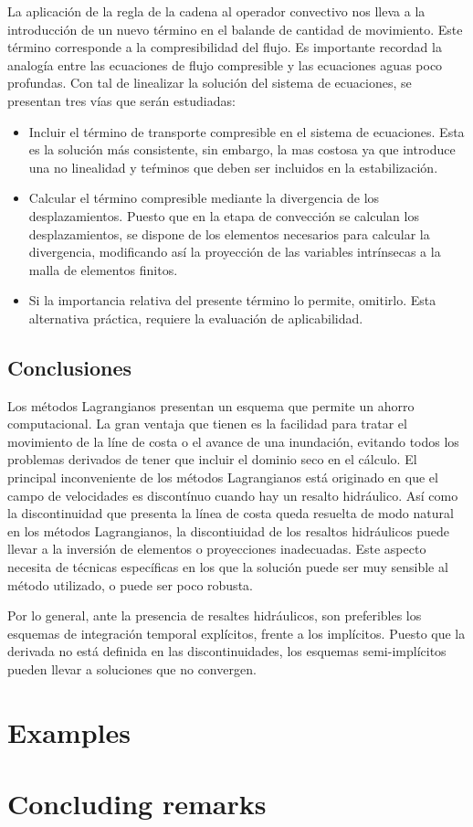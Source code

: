La aplicación de la regla de la cadena al operador convectivo nos lleva a la introducción de un nuevo término en el balande de cantidad de movimiento. Este término corresponde a la compresibilidad del flujo. Es importante recordad la analogía entre las ecuaciones de flujo compresible y las ecuaciones aguas poco profundas. Con tal de linealizar la solución del sistema de ecuaciones, se presentan tres vías que serán estudiadas:
\begin{itemize}
    \item Incluir el término de transporte compresible en el sistema de ecuaciones. Esta es la solución más consistente, sin embargo, la mas costosa ya que introduce una no linealidad y teŕminos que deben ser incluidos en la estabilización.
    \item Calcular el término compresible mediante la divergencia de los desplazamientos. Puesto que en la etapa de convección se calculan los desplazamientos, se dispone de los elementos necesarios para calcular la divergencia, modificando así la proyección de las variables intrínsecas a la malla de elementos finitos.
    \item Si la importancia relativa del presente término lo permite, omitirlo. Esta alternativa práctica, requiere la evaluación de aplicabilidad.
\end{itemize}


\subsection{Conclusiones}

Los métodos Lagrangianos presentan un esquema que permite un ahorro computacional. La gran ventaja que tienen es la facilidad para tratar el movimiento de la líne de costa o el avance de una inundación, evitando todos los problemas derivados de tener que incluir el dominio seco en el cálculo. El principal inconveniente de los métodos Lagrangianos está originado en que el campo de velocidades es discontínuo cuando hay un resalto hidráulico. Así como la discontinuidad que presenta la línea de costa queda resuelta de modo natural en los métodos Lagrangianos, la discontiuidad de los resaltos hidráulicos puede llevar a la inversión de elementos o proyecciones inadecuadas. Este aspecto necesita de técnicas específicas en los que la solución puede ser muy sensible al método utilizado, o puede ser poco robusta.

Por lo general, ante la presencia de resaltes hidráulicos, son preferibles los esquemas de integración temporal explícitos, frente a los implícitos. Puesto que la derivada no está definida en las discontinuidades, los esquemas semi-implícitos pueden llevar a soluciones que no convergen.




\section{Examples}



\section{Concluding remarks}


